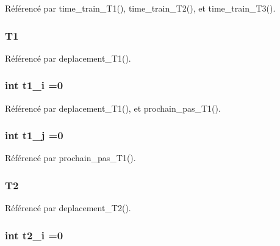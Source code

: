 Référencé par time\+\_\+train\+\_\+\+T1(), time\+\_\+train\+\_\+\+T2(), et time\+\_\+train\+\_\+\+T3().

\subsubsection[{T1}]{ T1}\label{thread_8h_af7563d32dc157f89b5e9b386e7734975}


Référencé par deplacement\+\_\+\+T1().

\subsubsection[{t1\+\_\+i}]{\setlength{\rightskip}{0pt plus 5cm}int t1\+\_\+i =0}\label{thread_8h_af6ffa3874789c1110bfa3560595be366}


Référencé par deplacement\+\_\+\+T1(), et prochain\+\_\+pas\+\_\+\+T1().

\subsubsection[{t1\+\_\+j}]{\setlength{\rightskip}{0pt plus 5cm}int t1\+\_\+j =0}\label{thread_8h_ad42771e3cfc13cf554e80f172ee24850}


Référencé par prochain\+\_\+pas\+\_\+\+T1().

\subsubsection[{T2}]{ T2}\label{thread_8h_a2f9633591cf59fbea33044d61e3b12df}


Référencé par deplacement\+\_\+\+T2().

\subsubsection[{t2\+\_\+i}]{\setlength{\rightskip}{0pt plus 5cm}int t2\+\_\+i =0}\label{thread_8h_a7eb268dc73344b7b5bb1c4ad1e9b8029}


